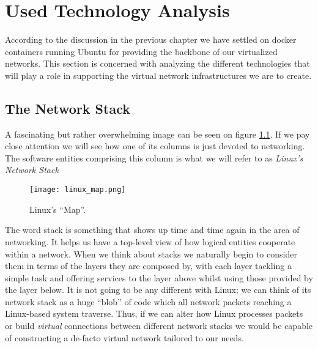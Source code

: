 \chapter{Used Technology Analysis} \label{chap:2}
    According to the discussion in the previous chapter we have settled on docker containers running Ubuntu for providing the backbone of our virtualized networks. This section is concerned with analyzing the different technologies that will play a role in supporting the virtual network infrastructures we are to create.\\

    \section{The Network Stack}
        A fascinating but rather overwhelming image can be seen on figure \ref{fig:linux-map}. If we pay close attention we will see how one of its columns is just devoted to networking. The software entities comprising this column is what we will refer to as \textit{Linux's Network Stack}\\

        \begin{figure}
            \centering
            \texttt{[image: linux\_map.png]}
            \caption[Linux Kernel Structure]{Linux's ``Map''. \cite{bib:linux-map}}
            \label{fig:linux-map}
        \end{figure}

         The word stack is something that shows up time and time again in the area of networking. It helps us have a top-level view of how logical entities cooperate within a network. When we think about stacks we naturally begin to consider them in terms of the layers they are composed by, with each layer tackling a simple task and offering services to the layer above whilst using those provided by the layer below. It is not going to be any different with Linux; we can think of its network stack as a huge ``blob'' of code which all network packets reaching a Linux-based system traverse. Thus, if we can alter how Linux processes packets or build \textit{virtual} connections between different network stacks we would be capable of constructing a de-facto virtual network tailored to our needs.\\

